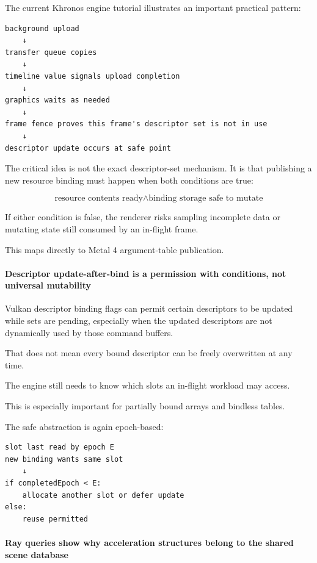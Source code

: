 The current Khronos engine tutorial illustrates an important practical pattern:

\begin{verbatim}
background upload
    ↓
transfer queue copies
    ↓
timeline value signals upload completion
    ↓
graphics waits as needed
    ↓
frame fence proves this frame's descriptor set is not in use
    ↓
descriptor update occurs at safe point
\end{verbatim}

The critical idea is not the exact descriptor-set mechanism. It is that publishing a new resource binding must happen when both conditions are true:

\[
\boxed{
\text{resource contents ready}
\land
\text{binding storage safe to mutate}
}
\]

If either condition is false, the renderer risks sampling incomplete data or mutating state still consumed by an in-flight frame.

This maps directly to Metal 4 argument-table publication.

\paragraph{Descriptor update-after-bind is a permission with conditions, not universal mutability}\label{descriptor-update-after-bind-is-a-permission-with-conditions-not-universal-mutability}

Vulkan descriptor binding flags can permit certain descriptors to be updated while sets are pending, especially when the updated descriptors are not dynamically used by those command buffers.

That does not mean every bound descriptor can be freely overwritten at any time.

The engine still needs to know which slots an in-flight workload may access.

This is especially important for partially bound arrays and bindless tables.

The safe abstraction is again epoch-based:

\begin{verbatim}
slot last read by epoch E
new binding wants same slot
    ↓
if completedEpoch < E:
    allocate another slot or defer update
else:
    reuse permitted
\end{verbatim}

\paragraph{Ray queries show why acceleration structures belong to the shared scene database}\label{ray-queries-show-why-acceleration-structures-belong-to-the-shared-scene-database}

